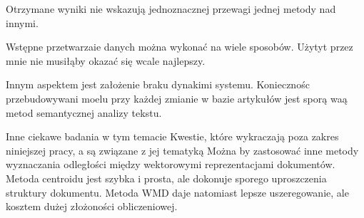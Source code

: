 \documentclass[pl]{minipw} %
\begin{document}
Otrzymane wyniki nie wskazują jednoznacznej przewagi jednej metody nad innymi.

Wstępne przetwarzaie danych można wykonać na wiele sposobów. Użytyt przez mnie nie musiłąby okazać się wcale najlepszy.

Innym aspektem jest założenie braku dynakimi systemu. Koniecznośc przebudowywani moelu przy każdej zmianie w bazie artykułów jest sporą waą metod semantycznej analizy tekstu.

Inne ciekawe badania w tym temacie
Kwestie, które wykraczają poza zakres niniejszej pracy, a są związane z jej tematyką
Można by zastosować inne metody wyznaczania odległości między wektorowymi reprezentacjami dokumentów. Metoda centroidu jest szybka i prosta, ale dokonuje sporego uproszczenia struktury dokumentu. Metoda WMD daje natomiast lepsze uszeregowanie, ale kosztem dużej złożoności obliczeniowej.
\end{document}
